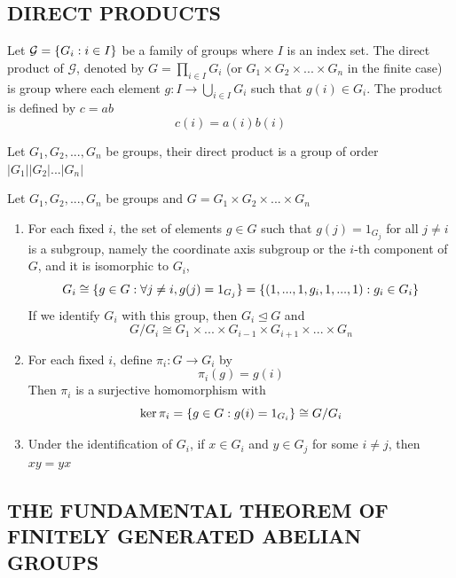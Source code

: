 \subsection{DIRECT PRODUCTS}

\begin{definition}
	Let $\mathcal{G} = \{G_i: i \in I\}$ be a family of groups where $I$ is an index set. The direct product of $\mathcal{G}$, denoted by $G = \prod_{i \in I} G_i$ (or $G_1 \times G_2 \times ... \times G_n$ in the finite case) is group where each element $g: I \to \bigcup_{i \in I} G_i$ such that $g(i) \in G_i$. The product is defined by $c = ab$
	\[
	c(i) = a(i) b(i)
	\]
\end{definition}

\begin{proposition}
	Let $G_1, G_2, ..., G_n$ be groups, their direct product is a group of order $|G_1||G_2|...|G_n|$
\end{proposition}

\begin{proposition}
	Let $G_1, G_2, ..., G_n$ be groups and $G = G_1 \times G_2 \times ... \times G_n$
	\begin{enumerate}
		\item For each fixed $i$, the set of elements $g \in G$ such that $g(j) = 1_{G_j}$ for all $j \neq i$ is a subgroup, namely the coordinate axis subgroup or the $i$-th component of $G$, and it is isomorphic to $G_i$,
		\[
		G_i \cong \{g \in G: \forall j \neq i, g(j) = 1_{G_j}\} = \{(1, ..., 1, g_i, 1, ..., 1): g_i \in G_i\}
		\]
		If we identify $G_i$ with this group, then $G_i \trianglelefteq G$ and
		\[
		G / G_i \cong G_1 \times ... \times G_{i-1} \times G_{i+1} \times ... \times G_n
		\]
		\item For each fixed $i$, define $\pi_i: G \to G_i$ by
		\[
		\pi_i(g) = g(i)
		\]
		Then $\pi_i$ is a surjective homomorphism with
		\[
		\ker \pi_i = \{g \in G: g(i) = 1_{G_i}\} \cong G / G_i
		\]
		\item Under the identification of $G_i$, if $x \in G_i$ and $y \in G_j$ for some $i \neq j$, then $xy = yx$
	\end{enumerate}
\end{proposition}

\subsection{THE FUNDAMENTAL THEOREM OF FINITELY GENERATED ABELIAN GROUPS}

